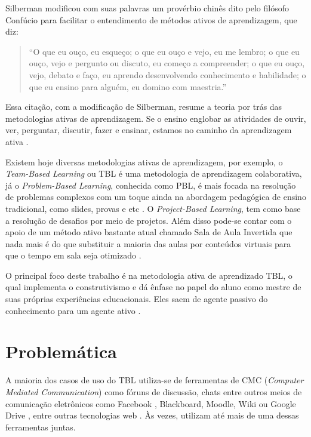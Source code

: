 Silberman modificou com suas palavras um provérbio chinês dito pelo filósofo Confúcio para facilitar o entendimento de métodos ativos de aprendizagem, que diz:

\begin{quote}
“O que eu ouço, eu esqueço; o que eu ouço e vejo, eu me lembro; o que eu ouço, vejo e pergunto ou discuto, eu começo a compreender; o que eu ouço, vejo, debato e faço, eu aprendo desenvolvendo conhecimento e habilidade; o que eu ensino para alguém, eu domino com maestria.”
\end{quote}

Essa citação, com a modificação de Silberman, resume a teoria por trás das metodologias ativas de aprendizagem. Se o ensino englobar as atividades de ouvir, ver,  perguntar, discutir, fazer e ensinar, estamos no caminho da aprendizagem ativa \cite{barbosa}.

Existem hoje diversas metodologias ativas de aprendizagem, por exemplo, o \textit{Team-Based Learning} ou TBL é uma metodologia de aprendizagem colaborativa, já o \textit{Problem-Based Learning}, conhecida como PBL, é mais focada na resolução de problemas complexos com um toque ainda na abordagem pedagógica de ensino tradicional, como slides, provas e etc \cite{cabrera}. O \textit{Project-Based Learning}, tem como base a resolução de desafios por meio de projetos. Além disso pode-se contar com o apoio de um método ativo bastante atual chamado Sala de Aula Invertida que nada mais é  do que substituir a maioria das aulas por conteúdos virtuais para que o tempo em sala seja otimizado \cite{moran}.

O principal foco deste trabalho é na metodologia ativa de aprendizado TBL, o qual  implementa o construtivismo e dá ênfase no papel do aluno como mestre de suas próprias experiências educacionais. Eles saem de agente passivo do conhecimento para um agente ativo \cite{gomez}.

\section{Problemática}

A maioria dos casos de uso do TBL utiliza-se de ferramentas de CMC (\textit{Computer Mediated Communication}) como fóruns de discussão, chats entre outros meios de comunicação eletrônicos como Facebook \cite{alhomod}, Blackboard, Moodle, Wiki ou Google Drive \cite{awatramani}, entre outras tecnologias web \cite{kam}. Às vezes, utilizam até mais de uma dessas ferramentas juntas.

